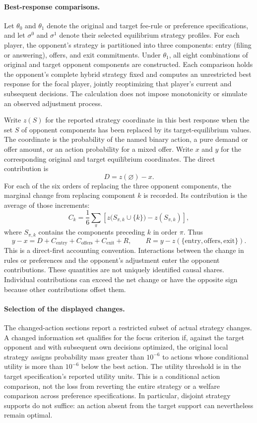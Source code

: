 \paragraph{Best-response comparisons.}
Let $\theta_0$ and $\theta_1$ denote the original and target fee-rule or preference
specifications, and let $\sigma^0$ and $\sigma^1$ denote their selected equilibrium
strategy profiles. For each player, the opponent's strategy is partitioned into
three components: entry (filing or answering), offers, and exit commitments.
Under $\theta_1$, all eight combinations of original and target opponent
components are constructed. Each comparison holds the opponent's complete
hybrid strategy fixed and computes an unrestricted best response for the focal
player, jointly reoptimizing that player's current and subsequent decisions.
The calculation does not impose monotonicity or simulate an observed
adjustment process.

Write $z(S)$ for the reported strategy coordinate in this best response when
the set $S$ of opponent components has been replaced by its target-equilibrium
values. The coordinate is the probability of the named binary action, a pure demand or
offer amount, or an action probability for a mixed offer. Write $x$ and $y$ for the corresponding original
and target equilibrium coordinates. The direct contribution is
\[
  D=z(\varnothing)-x.
\]
For each of the six orders of replacing the three opponent components, the
marginal change from replacing component $k$ is recorded. Its contribution is
the average of those increments:
\[
  C_k=\frac{1}{6}\sum_{\pi}
  \left[z\bigl(S_{\pi,k}\cup\{k\}\bigr)-z(S_{\pi,k})\right],
\]
where $S_{\pi,k}$ contains the components preceding $k$ in order $\pi$. Thus
\[
  y-x=D+C_{\mathrm{entry}}+C_{\mathrm{offers}}+C_{\mathrm{exit}}+R,
  \qquad R=y-z(\{\mathrm{entry},\mathrm{offers},\mathrm{exit}\}).
\]
This is a direct-first accounting convention. Interactions between the change
in rules or preferences and the opponent's adjustment enter the opponent
contributions. These quantities are not uniquely identified causal shares.
Individual contributions can exceed the net change or have the opposite sign
because other contributions offset them.

\paragraph{Selection of the displayed changes.}
The changed-action sections report a restricted subset of actual strategy changes. A changed
information set qualifies for the focus criterion if, against the target
opponent and with subsequent own decisions optimized, the original local
strategy assigns probability mass greater than $10^{-6}$ to actions whose
conditional utility is more than $10^{-6}$ below the best action. The utility
threshold is in the target specification's reported utility units. This is a
conditional action comparison, not the loss from reverting the entire strategy
or a welfare comparison across preference specifications. In particular,
disjoint strategy supports do not suffice: an action absent from the target
support can nevertheless remain optimal.


